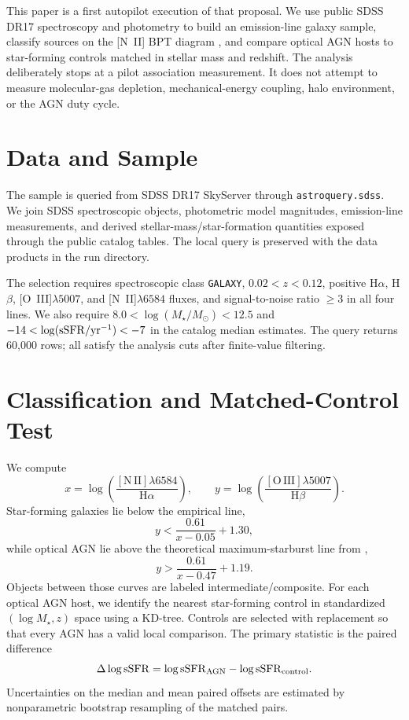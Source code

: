 \documentclass[twocolumn]{aastex631}
\begin{document}
This paper is a first autopilot execution of that proposal.  We use public SDSS DR17 spectroscopy and photometry to build an emission-line galaxy sample, classify sources on the [N~II] BPT diagram \citep{baldwin1981,kewley2001,kauffmann2003}, and compare optical AGN hosts to star-forming controls matched in stellar mass and redshift.  The analysis deliberately stops at a pilot association measurement.  It does not attempt to measure molecular-gas depletion, mechanical-energy coupling, halo environment, or the AGN duty cycle.

\section{Data and Sample}\label{sec:data}
The sample is queried from SDSS DR17 SkyServer through \texttt{astroquery.sdss}.  We join SDSS spectroscopic objects, photometric model magnitudes, emission-line measurements, and derived stellar-mass/star-formation quantities exposed through the public catalog tables.  The local query is preserved with the data products in the run directory.

The selection requires spectroscopic class \texttt{GALAXY}, $0.02<z<0.12$, positive H$\alpha$, H$\beta$, [O~III]$\lambda5007$, and [N~II]$\lambda6584$ fluxes, and signal-to-noise ratio $\geq3$ in all four lines.  We also require $8.0 < \log(M_\star/M_\odot) < 12.5$ and $-14 < \log({\rm sSFR}/{\rm yr}^{-1}) < -7$ in the catalog median estimates.  The query returns 60,000 rows; all satisfy the analysis cuts after finite-value filtering.

\section{Classification and Matched-Control Test}\label{sec:methods}
We compute
\begin{equation}
 x = \log\left(\frac{[\mathrm{N\,II}]\lambda6584}{\mathrm{H}\alpha}\right), \qquad
 y = \log\left(\frac{[\mathrm{O\,III}]\lambda5007}{\mathrm{H}\beta}\right).
\end{equation}
Star-forming galaxies lie below the empirical \citet{kauffmann2003} line,
\begin{equation}
 y < \frac{0.61}{x-0.05} + 1.30,
\end{equation}
while optical AGN lie above the theoretical maximum-starburst line from \citet{kewley2001},
\begin{equation}
 y > \frac{0.61}{x-0.47} + 1.19.
\end{equation}
Objects between those curves are labeled intermediate/composite.  For each optical AGN host, we identify the nearest star-forming control in standardized $(\log M_\star,z)$ space using a KD-tree.  Controls are selected with replacement so that every AGN has a valid local comparison.  The primary statistic is the paired difference
\begin{equation}
 \Delta\log{\rm sSFR} = \log{\rm sSFR}_{\rm AGN} - \log{\rm sSFR}_{\rm control}.
\end{equation}
Uncertainties on the median and mean paired offsets are estimated by nonparametric bootstrap resampling of the matched pairs.
\end{document}
